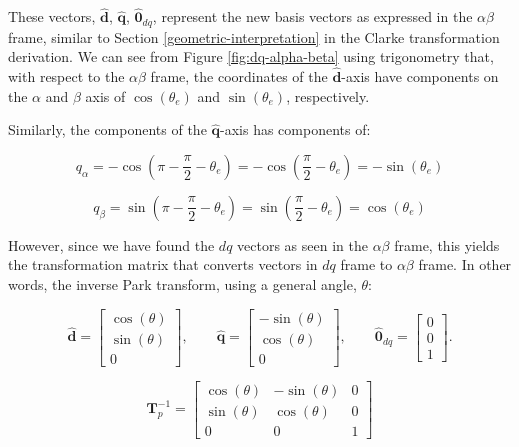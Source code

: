 \documentclass{article}
\begin{document}
These vectors, $\mathbf{\hat{d}}$, $\mathbf{\hat{q}}$, $\mathbf{\hat{0}}_{dq}$, represent the new basis vectors as expressed in the $\alpha\beta$ frame, similar to Section \ref{geometric-interpretation} in the Clarke transformation derivation. We can see from Figure \ref{fig:dq-alpha-beta} using trigonometry that, with respect to the $\alpha\beta$ frame, the coordinates of the $\mathbf{\hat{d}}$-axis have components on the $\alpha$ and $\beta$ axis of $\cos(\theta_e)$ and $\sin(\theta_e)$, respectively.

Similarly, the components of the $\mathbf{\hat{q}}$-axis has components of:

\begin{equation}
    q_\alpha = -\cos(\pi - \frac{\pi}{2} - \theta_e) = -\cos(\frac{\pi}{2} - \theta_e) = -\sin(\theta_e)
\end{equation}

\begin{equation}
    q_\beta = \sin(\pi - \frac{\pi}{2} - \theta_e) = \sin(\frac{\pi}{2} - \theta_e) = \cos(\theta_e)
\end{equation}

However, since we have found the $dq$ vectors as seen in the $\alpha\beta$ frame, this yields the transformation matrix that converts vectors in $dq$ frame to $\alpha\beta$ frame. In other words, the inverse Park transform, using a general angle, $\theta$:

\begin{equation}
    \hat{\mathbf{d}}
    =
    \begin{bmatrix}
        \cos(\theta) \\
        \sin(\theta) \\
        0
    \end{bmatrix},
    \qquad
    \hat{\mathbf{q}}
    =
    \begin{bmatrix}
        -\sin(\theta) \\
        \cos(\theta) \\
        0
    \end{bmatrix},
    \qquad
    \hat{\mathbf{0}}_{dq}
    =
    \begin{bmatrix}
        0 \\
        0 \\
        1
    \end{bmatrix}.
\end{equation}

\begin{equation}
    \mathbf{T}_p^{-1}
    =
    \begin{bmatrix}
        \cos(\theta) & -\sin(\theta) & 0 \\
        \sin(\theta) & \cos(\theta) & 0 \\
        0 & 0 & 1
    \end{bmatrix}
\end{equation}
\end{document}

